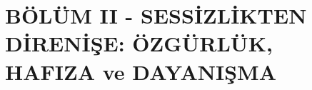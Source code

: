 \documentclass[
  letterpaper,
  DIV=11,
  numbers=noendperiod]{scrreprt}
\begin{document}
\chapter{}\label{section-1}

\chapter{}\label{section-2}

\chapter{}\label{section-3}

\chapter{}\label{section-4}

\chapter{}\label{section-5}

\chapter{}\label{section-6}

\chapter{}\label{section-7}

\chapter{}\label{section-8}

\part{BÖLÜM II - SESSİZLİKTEN DİRENİŞE: ÖZGÜRLÜK, HAFIZA ve DAYANIŞMA}

\chapter{}\label{section-9}

\chapter{}\label{section-10}

\chapter{}\label{section-11}
\end{document}
